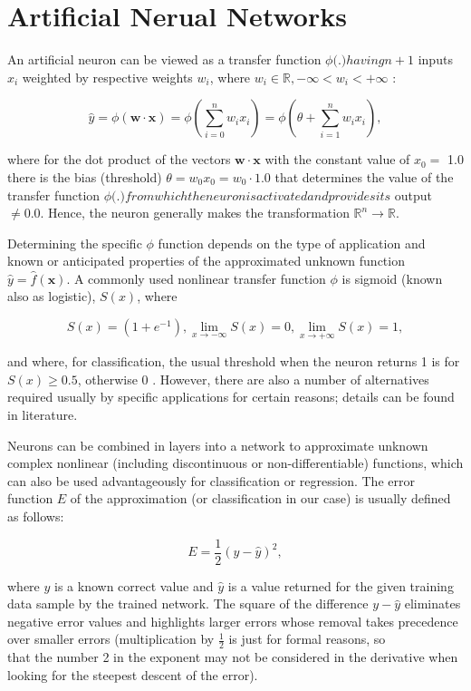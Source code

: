 \section{Artificial Nerual Networks}

An artificial neuron can be viewed as a transfer function $\phi($.$) having n+1$ inputs $x_i$ weighted by respective weights $w_{i}$, where $w_{i} \in \mathbb{R},-\infty<w_{i}<+\infty$ :

\begin{equation*}
\hat{y}=\phi(\mathbf{w} \cdot \mathbf{x})=\phi\left(\sum_{i=0}^{n} w_{i} x_{i}\right)=\phi\left(\theta+\sum_{i=1}^{n} w_{i} x_{i}\right), \tag{11.1}
\end{equation*}

where for the dot product of the vectors $\mathbf{w} \cdot \mathbf{x}$ with the constant value of $x_{0}=$ 1.0 there is the bias (threshold) $\theta=w_{0} x_{0}=w_{0} \cdot 1.0$ that determines the value of the transfer function $\phi($.$) from which the neuron is activated and provides its$ output $\neq 0.0$. Hence, the neuron generally makes the transformation $\mathbb{R}^{n} \rightarrow \mathbb{R}$.

Determining the specific $\phi$ function depends on the type of application and known or anticipated properties of the approximated unknown function $\hat{y}=\hat{f}(\mathbf{x})$. A commonly used nonlinear transfer function $\phi$ is sigmoid (known also as logistic), $S(x)$, where

$$
S(x)=\left(1+e^{-1}\right), \lim _{x \rightarrow-\infty} S(x)=0, \lim _{x \rightarrow+\infty} S(x)=1,
$$

and where, for classification, the usual threshold when the neuron returns 1 is for $S(x) \geq 0.5$, otherwise 0 . However, there are also a number of alternatives required usually by specific applications for certain reasons; details can be found in literature.

Neurons can be combined in layers into a network to approximate unknown complex nonlinear (including discontinuous or non-differentiable) functions, which can also be used advantageously for classification or regression. The error function $E$ of the approximation (or classification in our case) is usually defined as follows:


\begin{equation*}
E=\frac{1}{2}(y-\hat{y})^{2}, \tag{11.2}
\end{equation*}


where $y$ is a known correct value and $\hat{y}$ is a value returned for the given training data sample by the trained network. The square of the difference $y-\hat{y}$ eliminates negative error values and highlights larger errors whose removal takes precedence over smaller errors (multiplication by $\frac{1}{2}$ is just for formal reasons, so\\
that the number 2 in the exponent may not be considered in the derivative when looking for the steepest descent of the error).

